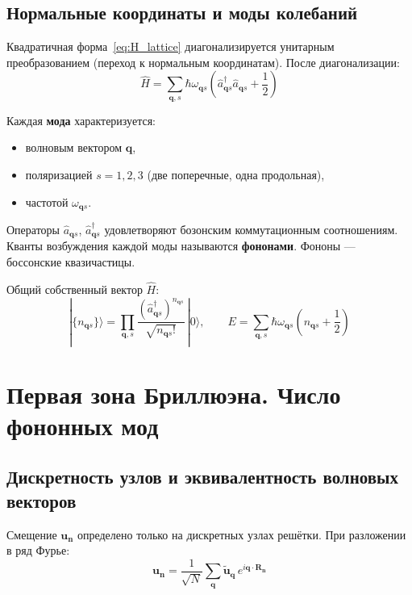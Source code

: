 \documentclass[../general/general]{subfiles}
\begin{document}
\subsection{Нормальные координаты и моды колебаний}

Квадратичная форма~\eqref{eq:H_lattice} диагонализируется унитарным преобразованием (переход к нормальным координатам). После диагонализации:
\begin{equation}
    \hat{H} = \sum_{\mathbf{q},s} \hbar\omega_{\mathbf{q}s}\!\left(\hat{a}^\dagger_{\mathbf{q}s}\hat{a}_{\mathbf{q}s} + \frac{1}{2}\right)
    \label{eq:H_phonon}
\end{equation}

Каждая \textbf{мода} характеризуется:
\begin{itemize}
    \item волновым вектором $\mathbf{q}$,
    \item поляризацией $s = 1, 2, 3$ (две поперечные, одна продольная),
    \item частотой $\omega_{\mathbf{q}s}$.
\end{itemize}

Операторы $\hat{a}_{\mathbf{q}s}$, $\hat{a}^\dagger_{\mathbf{q}s}$ удовлетворяют бозонским коммутационным соотношениям. Кванты возбуждения каждой моды называются \textbf{фононами}. Фононы --- боссонские квазичастицы.

Общий собственный вектор $\hat{H}$:
\begin{equation}
    |\{n_{\mathbf{q}s}\}\rangle = \prod_{\mathbf{q},s} \frac{(\hat{a}^\dagger_{\mathbf{q}s})^{n_{\mathbf{q}s}}}{\sqrt{n_{\mathbf{q}s}!}}\,|0\rangle, \qquad E = \sum_{\mathbf{q},s}\hbar\omega_{\mathbf{q}s}\!\left(n_{\mathbf{q}s} + \frac{1}{2}\right)
\end{equation}



\section{Первая зона Бриллюэна. Число фононных мод}

\subsection{Дискретность узлов и эквивалентность волновых векторов}

Смещение $\mathbf{u}_\mathbf{n}$ определено только на дискретных узлах решётки. При разложении в ряд Фурье:
\begin{equation}
    \mathbf{u}_\mathbf{n} = \frac{1}{\sqrt{N}}\sum_\mathbf{q} \tilde{\mathbf{u}}_\mathbf{q}\,e^{i\mathbf{q}\cdot\mathbf{R}_\mathbf{n}}
\end{equation}
\end{document}
